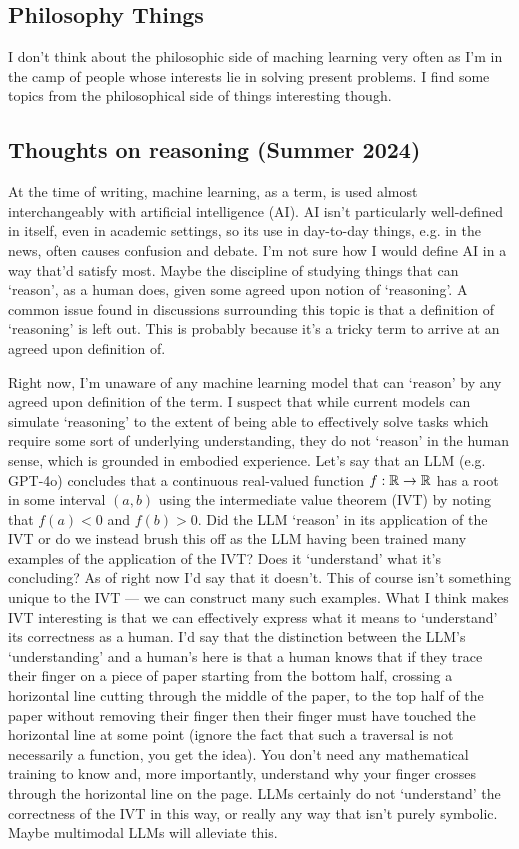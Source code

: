\documentclass[11pt]{article}
\begin{document}
\begin{appendices}
\section{Philosophy Things}
I don't think about the philosophic side of maching learning very often as I'm in the camp of people whose interests lie in solving present problems. I find some topics from the philosophical side of things interesting though.

\subsection{Thoughts on reasoning (Summer 2024)}

At the time of writing, machine learning, as a term, is used almost interchangeably with artificial intelligence (AI). AI isn't particularly well-defined in itself, even in academic settings, so its use in day-to-day things, e.g. in the news, often causes confusion and debate. I'm not sure how I would define AI in a way that'd satisfy most. Maybe the discipline of studying things that can `reason', as a human does, given some agreed upon notion of `reasoning'. A common issue found in discussions surrounding this topic is that a definition of `reasoning' is left out. This is probably because it's a tricky term to arrive at an agreed upon definition of.

Right now, I'm unaware of any machine learning model that can `reason' by any agreed upon definition of the term. I suspect that while current models can simulate `reasoning' to the extent of being able to effectively solve tasks which require some sort of underlying understanding, they do not `reason' in the human sense, which is grounded in embodied experience. Let's say that an LLM (e.g. GPT-4o) concludes that a continuous real-valued function $f:\mathbb{R}\rightarrow\mathbb{R}$ has a root in some interval $(a, b)$ using the intermediate value theorem (IVT) by noting that $f(a)<0$ and $f(b)>0$. Did the LLM `reason' in its application of the IVT or do we instead brush this off as the LLM having been trained many examples of the application of the IVT? Does it `understand' what it's concluding? As of right now I'd say that it doesn't. This of course isn't something unique to the IVT — we can construct many such examples. What I think makes IVT interesting is that we can effectively express what it means to `understand' its correctness as a human. I'd say that the distinction between the LLM's `understanding' and a human's here is that a human knows that if they trace their finger on a piece of paper starting from the bottom half, crossing a horizontal line cutting through the middle of the paper, to the top half of the paper without removing their finger then their finger must have touched the horizontal line at some point (ignore the fact that such a traversal is not necessarily a function, you get the idea). You don't need any mathematical training to know and, more importantly, understand why your finger crosses through the horizontal line on the page. LLMs certainly do not `understand' the correctness of the IVT in this way, or really any way that isn't purely symbolic. Maybe multimodal LLMs will alleviate this.


\end{appendices}
\end{document}
